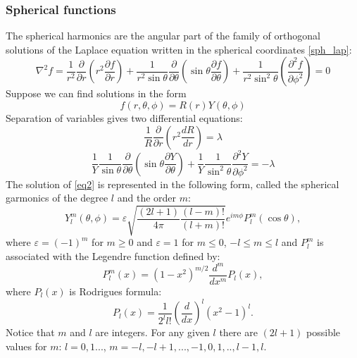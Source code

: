 \documentclass[a4paper, 12pt]{article}
\begin{document}
\subsubsection{Spherical functions}
The spherical harmonics are the angular part of the family of orthogonal solutions of the Laplace equation written in the spherical coordinates \eqref{sph_lap}:
$$\nabla^2 {f} = \frac{1}{r^2} \frac{\partial}{\partial r}({r^2}\frac{\partial f}{\partial r})+\frac{1}{r^2\sin{\theta}}\frac{\partial}{\partial \theta}(\sin{\theta}\frac{\partial f}{\partial \theta})+\frac{1}{r^2\sin^2{\theta}}(\frac{\partial^2 f}{\partial \phi^2}) = 0$$
Suppose we can find solutions in the form $$f({r}, \theta, \phi) = R(r)Y(\theta, \phi)$$
Separation of variables gives two differential equations:
$$\frac{1}{R}\frac{\partial}{\partial r}(r^2 \frac {dR}{dr}) = \lambda$$
\begin{equation}\label{eq2}
	\frac{1}{Y}\frac{1}{\sin{\theta}}\frac{\partial}{\partial \theta}(\sin{\theta}\frac{\partial Y}{\partial \theta})+\frac{1}{Y}\frac{1}{\sin^2{\theta}}\frac{\partial^2 Y}{\partial \phi^2} = -\lambda
\end{equation}
The solution of \eqref{eq2} is represented in the following form, called the spherical garmonics of the degree $l$ and the order $m$:
\begin{equation}\label{sph_garm}   
   Y_l^m(\theta, \phi)=\varepsilon \sqrt{\frac{(2l+1)}{4\pi}\frac{(l-m)!}{(l+m)!}}e^{im\phi}P_l^m(\cos{\theta}),
\end{equation}
 where $\varepsilon = (-1)^m$ for $m\geq0$ and $\varepsilon=1$ for $m \leq 0$, $-l \leq m \leq l$ and $P_l^m $ is associated with the Legendre function defined by:
	$$P_l^m(x)= (1-x^2)^{m/2}\frac{d^m}{dx^m} P_l(x),$$
where $P_l(x) $ is Rodrigues formula:
	$$P_l(x) = \frac{1}{2^l l!}(\frac{d}{dx})^l (x^2-1)^l.$$
Notice that $m$ and $l$ are integers. For any given $l$ there are $(2l+1)$ possible values for $m$: $l=0, 1...$, $m = -l, -l+1,..., -1, 0, 1, .., l-1, l.$\\
\end{document}
